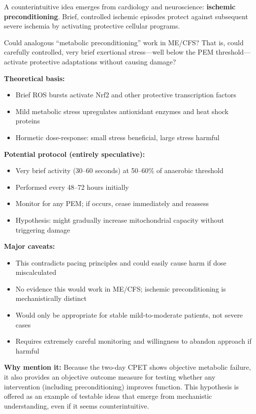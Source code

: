 \begin{open_question}
A counterintuitive idea emerges from cardiology and neuroscience: \textbf{ischemic preconditioning}. Brief, controlled ischemic episodes protect against subsequent severe ischemia by activating protective cellular programs.

Could analogous ``metabolic preconditioning'' work in ME/CFS? That is, could carefully controlled, very brief exertional stress---well below the PEM threshold---activate protective adaptations without causing damage?

\textbf{Theoretical basis:}
\begin{itemize}
    \item Brief ROS bursts activate Nrf2 and other protective transcription factors
    \item Mild metabolic stress upregulates antioxidant enzymes and heat shock proteins
    \item Hormetic dose-response: small stress beneficial, large stress harmful
\end{itemize}

\textbf{Potential protocol (entirely speculative):}
\begin{itemize}
    \item Very brief activity (30--60 seconds) at 50--60\% of anaerobic threshold
    \item Performed every 48--72 hours initially
    \item Monitor for any PEM; if occurs, cease immediately and reassess
    \item Hypothesis: might gradually increase mitochondrial capacity without triggering damage
\end{itemize}

\textbf{Major caveats:}
\begin{itemize}
    \item This contradicts pacing principles and could easily cause harm if dose miscalculated
    \item No evidence this would work in ME/CFS; ischemic preconditioning is mechanistically distinct
    \item Would only be appropriate for stable mild-to-moderate patients, not severe cases
    \item Requires extremely careful monitoring and willingness to abandon approach if harmful
\end{itemize}

\textbf{Why mention it:} Because the two-day CPET shows objective metabolic failure, it also provides an objective outcome measure for testing whether any intervention (including preconditioning) improves function. This hypothesis is offered as an example of testable ideas that emerge from mechanistic understanding, even if it seems counterintuitive.
\end{open_question}

